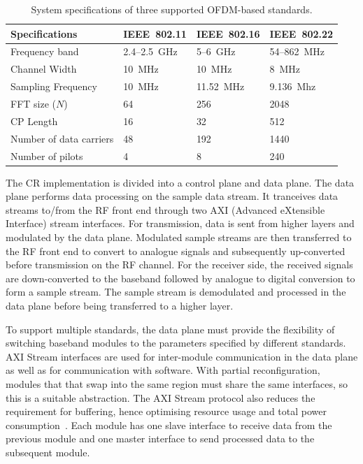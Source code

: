\begin{table}[h]
\centering
\caption{System specifications of three supported OFDM-based standards.}{
\renewcommand{\arraystretch}{1.3}
\begin{tabular}{@{}llll@{}}
\toprule
Specifications 			& IEEE~802.11 				& IEEE~802.16				& IEEE~802.22 		\\ \midrule
Frequency band			& 2.4--2.5~GHz				& 5--6~GHz					& 54--862~MHz		\\
Channel Width			& 10~MHz					& 10~MHz					& 8~MHz			\\
Sampling Frequency		& 10~MHz					& 11.52~MHz				& 9.136~Mhz		\\
FFT size ($N$)		& 64						& 256						& 2048			\\
CP Length				& 16						& 32						& 512				\\
Number of data carriers		& 48						& 192						& 1440			\\
Number of pilots			& 4						& 8						& 240				\\
\end{tabular}
\label{Tab:spec}
}
\end{table}

The CR implementation is divided into a control plane and data plane.
The data plane performs data processing on the sample data stream.
It tranceives data streams to/from the RF front end through two AXI (Advanced eXtensible Interface) stream interfaces.
For transmission, data is sent from higher layers and modulated by the data plane.
Modulated sample streams are then transferred to the RF front end to convert to analogue signals and subsequently up-converted before transmission on the RF channel.
For the receiver side, the received signals are down-converted to the baseband followed by analogue to digital conversion to form a sample stream.
The sample stream is demodulated and processed in the data plane before being transferred to a higher layer.

To support multiple standards, the data plane must provide the flexibility of switching baseband modules to the parameters specified by different standards.
AXI Stream interfaces are used for inter-module communication in the data plane as well as for communication with software.
With partial reconfiguration, modules that that swap into the same region must share the same interfaces, so this is a suitable abstraction.
The AXI Stream protocol also reduces the requirement for buffering, hence optimising resource usage and total power consumption~\cite{Liu2009}.
Each module has one slave interface to receive data from the previous module and one master interface to send processed data to the subsequent module.

